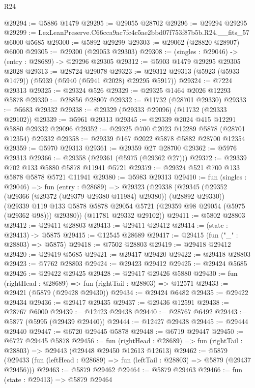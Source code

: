 \begin{lexlean}{R24}
\begin{coremodule}
@29294 := @5886 @1479
@29295 := @29055 @28702
@29296 := @29294 @29295
@29299 := LexLeanPreserve.C66cca9ac7fc4c5ae2bbd07f753f87b5b.R24.__fits_57 @6000 @5685
@29300 := @5892 @29299
@29303 := @29062 (@28820 @28907) @6000
@29305 := @29300 (@29053 @29303)
@29308 := (singles : @29046) -> (entry : @28689) -> @29296 @29305
@29312 := @5903 @1479 @29295 @29305 @2028
@29313 := @28724 @29078
@29323 := @29312 @29313 (@5923 (@5933 @1479)) (@5939 (@5940 (@5941 @2028) @29295 @5917))
@29324 := @7224 @29313
@29325 := @29324 @526
@29329 := @29325 @1464 @2026 @12293 @5878
@29330 := @28856 @28907
@29332 := @11732 (@28701 @29330)
@29333 := @5683 @29332
@29338 := @29329 (@29333 @29096) (@11732 (@29333 @29102))
@29339 := @5961 @29313
@29345 := @29339 @2024 @415 @12291 @5880 @29332 @29096
@29352 := @29325 @700 @2023 @12289 @5878 (@28701 @12354) @29332
@29358 := @29339 @167 @2022 @5878 @5882 @28700 @12354
@29359 := @5970 @29313
@29361 := @29359 @27 @28700
@29362 := @5976 @29313
@29366 := @29358 (@29361 (@5975 (@29362 @27)))
@29372 := @29339 @702 @133 @5880 @5878 @11941 @5721
@29379 := @29324 @521 @700 @133 @5878 @5878 @5721 @11941
@29380 := @5983 @29313
@29410 := fun (singles : @29046) =>
  fun (entry : @28689) =>
  @29323
    (@29338
      (@29345
        (@29352 (@29366 (@29372 (@29379 @29380 @11984) @29380)) (@28892 @29330))
        (@29339 @119 @133 @5878 @5878 @29054 @5721 (@29359 @98 @29054 (@5975 (@29362 @98))) @29380))
      (@11781 @29332 @29102))
@29411 := @5802 @28803
@29412 := @29411 @28803
@29413 := @29411 @29412
@29414 := (state : @29413) -> @5875
@29415 := @12545 @28689
@29417 := @29415 (fun ("_" : @28803) => @5875)
@29418 := @7502 @28803
@29419 := @29418 @29412
@29420 := @29419 @5685
@29421 := @29417 @29420
@29422 := @29418 @28803
@29423 := @7762 @28803
@29424 := @29423 @29412
@29425 := @29424 @5685
@29426 := @29422 @29425
@29428 := @29417 @29426 @5880
@29430 := fun (rightHead : @28689) => fun (rightTail : @28803) => @12571
@29433 := @29421 (@5879 (@29428 @29430))
@29434 := @29424 @6482
@29435 := @29422 @29434
@29436 := @29417 @29435
@29437 := @29436 @12591
@29438 := @28767 @6000
@29439 := @12423 @29438
@29440 := @28767 @6492
@29443 := @5877 (@5995 (@29439 @29440))
@29444 := @12427 @29438
@29445 := @29444 @29440
@29447 := @6720 @29445 @5878
@29448 := @6719 @29447
@29450 := @6727 @29445 @5878
@29456 := fun (rightHead : @28689) =>
  fun (rightTail : @28803) => @29443 (@29448 @29450 @12613 @12613)
@29462 := @5879
    (@29433 (fun (leftHead : @28689) => fun (leftTail : @28803) => @5879 (@29437 @29456)))
@29463 := @5879 @29462
@29464 := @5879 @29463
@29466 := fun (state : @29413) => @5879 @29464

\end{coremodule}
\end{lexlean}
